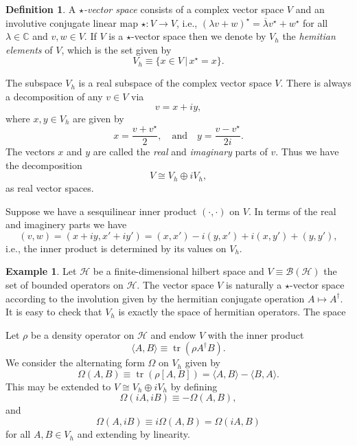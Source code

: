 \documentclass[prl,twocolumn,lengthcheck,superscriptaddress]{revtex4-1}
\newcommand{\tr}{\operatorname{tr}}
\theoremstyle{definition}
\newtheorem{definition}{Definition}
\newtheorem{example}{Example}
\theoremstyle{remark}
\begin{document}
\begin{definition}
	A \emph{$\star$-vector space} consists of a complex vector space $V$ and an involutive conjugate linear map $\star:V\rightarrow V$, i.e., $(\lambda v + w)^\star = \overline{\lambda}v^\star + w^\star$ for all $\lambda \in \mathbb{C}$ and $v,w \in V$. If $V$ is a $\star$-vector space then we denote by $V_h$ the \emph{hemitian elements} of $V$, which is the set given by
	\begin{equation}
		V_h \equiv \{x\in V\,|\, x^\star = x\}.
	\end{equation}
\end{definition}

The subspace $V_h$ is a real subspace of the complex vector space $V$. There is always a decomposition of any $v\in V$ via
\begin{equation}
	v = x+iy, 
\end{equation}
where $x,y \in V_h$ are given by 
\begin{equation}
	x = \frac{v+v^\star}{2},\quad\text{and}\quad y = \frac{v-v^\star}{2i}.
\end{equation} 
The vectors $x$ and $y$ are called the \emph{real} and \emph{imaginary} parts of $v$. Thus we have the decomposition
\begin{equation}
	V \cong V_h\oplus iV_h,
\end{equation}
as real vector spaces.

Suppose we have a sesquilinear inner product $(\cdot ,\cdot )$ on $V$. In terms of the real and imaginery parts we have
\begin{equation}
	(v,w) = (x+iy, x'+iy') = (x,x') - i(y,x') + i(x,y') + (y,y'),
\end{equation}
i.e., the inner product is determined by its values on $V_h$.

\begin{example}
	Let $\mathcal{H}$ be a finite-dimensional hilbert space and $V \equiv \mathcal{B}(\mathcal{H})$ the set of bounded operators on $\mathcal{H}$. The vector space $V$ is naturally a $\star$-vector space according to the involution given by the hermitian conjugate operation $A\mapsto A^\dag$. It is easy to check that $V_h$ is exactly the space of hermitian operators. The space 
	
	Let $\rho$ be a density operator on $\mathcal{H}$ and endow $V$ with the inner product 
	\begin{equation}
		\langle A, B\rangle \equiv \tr(\rho A^\dag B).
	\end{equation}
	We consider the alternating form $\Omega$ on $V_h$ given by
	\begin{equation}
		\Omega(A,B) \equiv \tr(\rho [A,B]) = \langle A, B\rangle-\langle B, A\rangle.
	\end{equation}
	This may be extended to $V \cong V_h\oplus iV_h$ by defining
	\begin{equation}
		\Omega(iA,iB) \equiv -\Omega(A,B),
	\end{equation}
	and
	\begin{equation}
		\Omega(A,iB) \equiv i\Omega(A,B) = \Omega(iA,B)
	\end{equation}
	for all $A,B\in V_h$ and extending by linearity.
\end{example}
\end{document}

